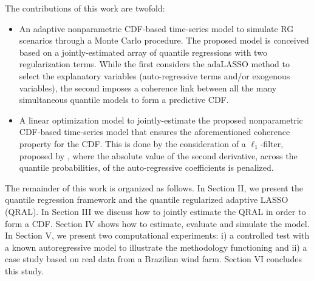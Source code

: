 The contributions of this work are twofold:
\begin{itemize}
	\item An adaptive nonparametric CDF-based time-series model to simulate RG scenarios through a Monte Carlo procedure. The proposed model is conceived based on a jointly-estimated array of quantile regressions with two regularization terms. While the first considers the adaLASSO method to select the explanatory variables (auto-regressive terms and/or exogenous variables), the second imposes a coherence link between all the many simultaneous quantile models to form a predictive CDF.
	
	\item A linear optimization model to jointly-estimate the proposed nonparametric CDF-based time-series model that ensures the aforementioned coherence property for the CDF. This is done by the consideration of a $\ell_1$-filter, proposed by \cite{kim2009ell_1}, where the absolute value of the second derivative, across the quantile probabilities, of the auto-regressive coefficients is penalized.
	
\end{itemize}




The remainder of this work is organized as follows. In Section II, we present the quantile regression framework and the quantile regularized adaptive LASSO (QRAL). In Section III we discuss how to jointly estimate the QRAL in order to form a CDF. Section IV shows how to estimate, evaluate and simulate the model. In Section V, we present two computational experiments: i) a controlled test with a known autoregressive model to illustrate the methodology functioning and ii) a case study based on real data from a Brazilian wind farm. Section VI concludes this study.

